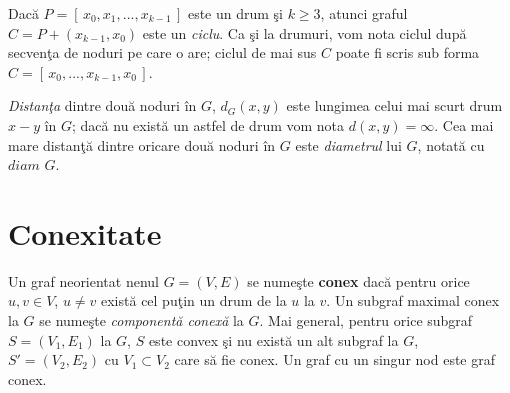 \documentclass[11pt,a4paper]{report}
\newtheorem{prop}{Propozi\c tie}
\newenvironment{demo}{\paragraph{\textbf{Demonstra\c{t}ie}:}}{\hfill$\square$}
\begin{document}
    Dac\u a $P=[\,x_0,x_1,...,x_{k-1}\,]$ este un drum \c si $k\ge 3$, atunci graful $C=P+(x_{k-1},x_0)$ este un \textit{ciclu}. Ca \c si la drumuri, vom nota ciclul dup\u a secven\c ta de noduri pe care o are; ciclul de mai sus $C$ poate fi scris  sub forma $C=[\,x_0,...,x_{k-1},x_0\,]$.
    
    \textit{Distan\c ta} dintre dou\u a noduri \^ in $G$, $d_G(x,y)$ este lungimea celui mai scurt drum $x-y$ \^ in $G$; dac\u a nu exist\u a un astfel de drum vom nota $d(x,y)=\infty$. Cea mai mare distan\c t\u a dintre oricare dou\u a noduri \^ in $G$ este \textit{diametrul} lui $G$, notat\u a cu $diam\,\,G$.
    
    \section{Conexitate}
    
    Un graf neorientat nenul $G=(V,E)$ se nume\c ste \textbf{conex} dac\u a pentru orice $u,v\in V $, $u\neq v$ exist\u a cel pu\c tin un drum de la $u$ la $v$. Un subgraf maximal conex la $G$  se nume\c ste \textit{component\u a conex\u a} la $G$. Mai general, pentru orice subgraf $S=(V_1,E_1)$ la $G$, $S$ este convex \c si nu exist\u a un alt subgraf la $G$, $S'=(V_2,E_2)$ cu $V_1\subset V_2$ care s\u a fie conex. Un graf cu un singur nod este graf conex.
    
\end{document}
